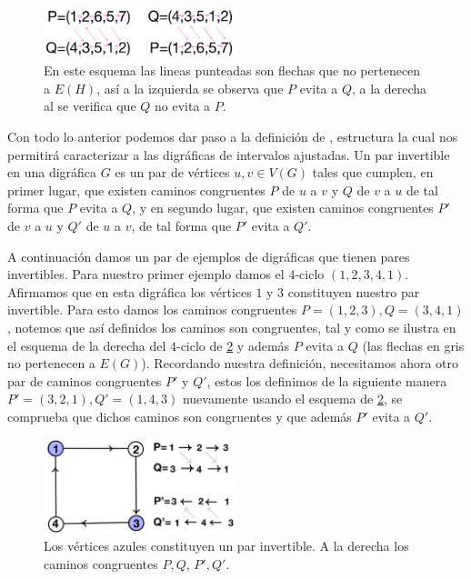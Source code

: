 \begin{figure}[H]
  \centering
  \includegraphics[width=0.5\textwidth]{recursos/capturas/Esqm.jpg}
  \caption{En este esquema las lineas punteadas son flechas que no pertenecen a $E(H)$, así a la izquierda se observa que $P$ evita a $Q$, a la derecha al se verifica que $Q$ no evita a $P$.}
  \label{fig:Esqm}
\end{figure}

Con todo lo anterior podemos dar paso a la definición de , estructura la cual nos permitirá caracterizar a las digráficas de intervalos ajustadas. Un par invertible en una digráfica $G$ es un par de vértices $u,v \in V(G)$ tales que cumplen, en primer lugar, que existen caminos congruentes $P$ de $u$ a $v$ y $Q$ de $v$ a $u$ de tal forma que $P$ evita a $Q$, y en segundo lugar, que existen caminos congruentes $P'$ de $v$ a $u$ y $Q'$ de $u$ a $v$, de tal forma que $P'$ evita a $Q'$.

A continuación damos un par de ejemplos de digráficas que tienen pares invertibles. Para nuestro primer ejemplo damos el $4$-ciclo $(1,2,3,4,1)$. Afirmamos que en esta digráfica los vértices $1$ y $3$ constituyen nuestro par invertible. Para esto damos los caminos congruentes $P=(1,2,3), Q=(3,4,1)$, notemos que así definidos los caminos son congruentes, tal y como se ilustra en el esquema de la derecha del $4$-ciclo de \cref{fig:InvrtblPair01} y además $P$ evita a $Q$ (las flechas en gris no pertenecen a $E(G)$). Recordando nuestra definición, necesitamos ahora otro par de caminos congruentes $P'$ y $Q'$, estos los definimos de la siguiente manera $P'=(3,2,1), Q'=(1,4,3)$ nuevamente usando el esquema de \cref{fig:InvrtblPair01}, se comprueba que dichos caminos son congruentes y que además $P'$ evita a $Q'$.

\begin{figure}[H]
  \centering
  \includegraphics[width=0.5\textwidth]{recursos/capturas/InvtblPair01.jpg}
  \caption{Los vértices azules constituyen un par invertible. A la derecha los caminos congruentes $P,Q$, $P',Q'$.}
  \label{fig:InvrtblPair01}
\end{figure}


